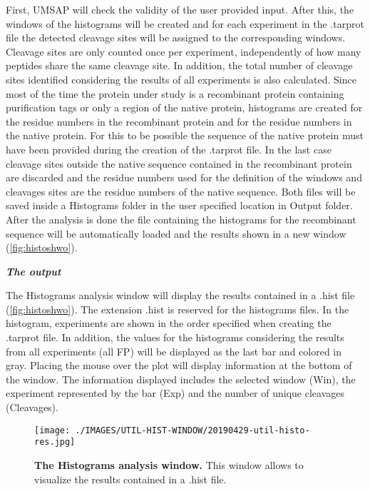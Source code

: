First, UMSAP will check the validity of the user provided input. After this, the windows of the histograms will be created and for each experiment in the .tarprot file the detected cleavage sites will be assigned to the corresponding windows. Cleavage sites are only counted once per experiment, independently of how many peptides share the same cleavage site. In addition, the total number of cleavage sites identified considering the results of all experiments is also calculated. Since most of the time the protein under study is a recombinant protein containing purification tags or only a region of the native protein, histograms are created for the residue numbers in the recombinant protein and for the residue numbers in the native protein. For this to be possible the sequence of the native protein must have been provided during the creation of the .tarprot file. In the last case cleavage sites outside the native sequence contained in the recombinant protein are discarded and the residue numbers used for the definition of the windows and cleavages sites are the residue numbers of the native sequence. Both files will be saved inside a Histograms folder in the user specified location in Output folder. After the analysis is done the file containing the histograms for the recombinant sequence will be automatically loaded and the results shown in a new window (\autoref{fig:histoshwo}).

\textit{\textbf{The output}}

The Histograms analysis window will display the results contained in a .hist file (\autoref{fig:histoshwo}). The extension .hist is reserved for the histograms files. In the histogram, experiments are shown in the order specified when creating the .tarprot file. In addition, the values for the histograms considering the results from all experiments (all FP) will be displayed as the last bar and colored in gray. Placing the mouse over the plot will display information at the bottom of the window. The information displayed includes the selected window (Win), the experiment represented by the bar (Exp) and the number of unique cleavages (Cleavages).

\begin{figure}[h]
	\centering
	\texttt{[image: ./IMAGES/UTIL-HIST-WINDOW/20190429-util-histo-res.jpg]}	    
	\caption[The Histograms analysis window]{\textbf{The Histograms analysis window.} This window allows to visualize the results contained in a .hist file.} 
	\label{fig:histoshwo}
	\vspace{-5pt} 	
\end{figure}

